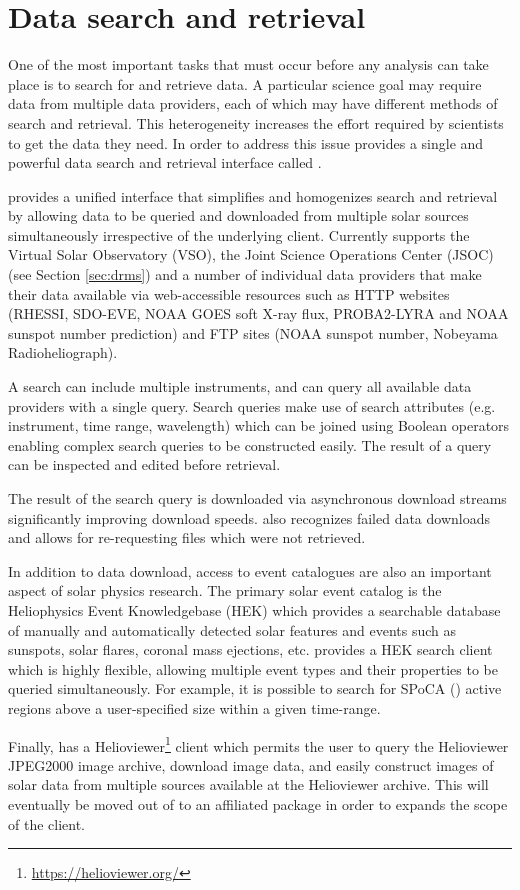 \section{Data search and retrieval}
\label{sec:fido}

One of the most important tasks that must occur before any analysis can take place is to search for and retrieve data.
A particular science goal may require data from multiple data providers, each of which may have different methods of search and retrieval.
This heterogeneity increases the effort required by scientists to get the data they need.
In order to address this issue \sunpypkg provides a single and powerful data search and retrieval interface called \Fido.

\Fido provides a unified interface that simplifies and homogenizes search and retrieval by allowing data to be queried and downloaded from multiple solar sources simultaneously irrespective of the underlying client.
Currently \Fido supports the Virtual Solar Observatory (VSO), the Joint Science Operations Center (JSOC) (see Section \ref{sec:drms}) and a number of individual data providers that make their data available via web-accessible resources such as HTTP websites (RHESSI, SDO-EVE, NOAA GOES soft X-ray flux, PROBA2-LYRA and NOAA sunspot number prediction) and FTP sites (NOAA sunspot number, Nobeyama Radioheliograph).

A \Fido search can include multiple instruments, and can query all available data providers with a single query.
Search queries make use of search attributes (e.g. instrument, time range, wavelength) which can be joined using Boolean operators enabling complex search queries to be constructed easily.
The result of a query can be inspected and edited before retrieval.

The result of the \Fido search query is downloaded via asynchronous download streams significantly improving download speeds.
\Fido also recognizes failed data downloads and allows for re-requesting files which were not retrieved.

In addition to data download, access to event catalogues are also an important aspect of solar physics research.
The primary solar event catalog is the Heliophysics Event Knowledgebase (HEK) which provides a searchable database of manually and automatically detected solar features and events such as sunspots, solar flares, coronal mass ejections, etc. \sunpypkg provides a HEK search client which is highly flexible, allowing multiple event types and their properties to be queried simultaneously.
For example, it is possible to search for SPoCA (\cite{2014AA...561A..29V}) active regions above a user-specified size within a given time-range.

Finally, \sunpypkg has a Helioviewer\footnote{\url{https://helioviewer.org/}} client which permits the user to query the Helioviewer JPEG2000 image archive, download image data, and easily construct images of solar data from multiple sources available at the Helioviewer archive.
This will eventually be moved out of \sunpypkg to an affiliated package in order to expands the scope of the client.
